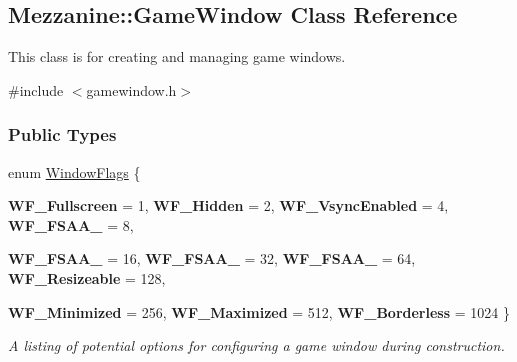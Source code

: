 \hypertarget{classMezzanine_1_1GameWindow}{
\subsection{Mezzanine::GameWindow Class Reference}
\label{classMezzanine_1_1GameWindow}
}


This class is for creating and managing game windows.  




{\ttfamily \#include $<$gamewindow.h$>$}

\subsubsection*{Public Types}
\begin{DoxyCompactItemize}
\item 
enum \hyperlink{classMezzanine_1_1GameWindow_ac31ba18e78ad8c6e749019726a0dbe6f}{WindowFlags} \{ \par
{\bfseries WF\_\-Fullscreen} =  1, 
{\bfseries WF\_\-Hidden} =  2, 
{\bfseries WF\_\-VsyncEnabled} =  4, 
{\bfseries WF\_\-FSAA\_} =  8, 
\par
{\bfseries WF\_\-FSAA\_} =  16, 
{\bfseries WF\_\-FSAA\_} =  32, 
{\bfseries WF\_\-FSAA\_} =  64, 
{\bfseries WF\_\-Resizeable} =  128, 
\par
{\bfseries WF\_\-Minimized} =  256, 
{\bfseries WF\_\-Maximized} =  512, 
{\bfseries WF\_\-Borderless} =  1024
 \}
\begin{DoxyCompactList}\small\item\em A listing of potential options for configuring a game window during construction. \item\end{DoxyCompactList}\end{DoxyCompactItemize}

